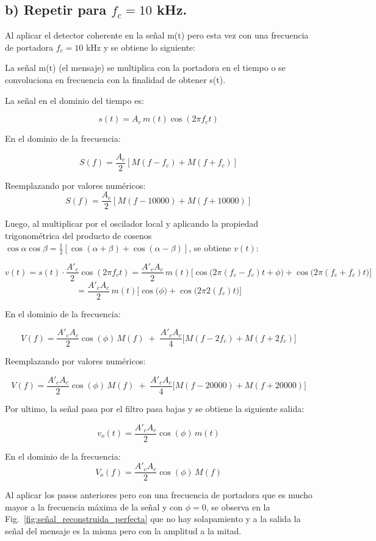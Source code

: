 \subsection*{b) Repetir para $f_c=10$ kHz.}  

Al aplicar el detector coherente en la señal m(t) pero esta vez con una frecuencia de portadora $f_c=10$ kHz y se obtiene lo siguiente:
\bigskip

La señal m(t) (el mensaje) se multiplica con la portadora en el tiempo o se convoluciona en frecuencia con la finalidad de obtener s(t).
\bigskip

La señal en el dominio del tiempo es:

\[
s(t) = A_c \, m(t) \cos(2\pi f_c t)
\]

En el dominio de la frecuencia:

\[
S(f) = \frac{A_c}{2} \left[ M(f-f_c) + M(f+f_c) \right]
\]

Reemplazando por valores numéricos:
\[
S(f) = \frac{A_c}{2} \left[ M(f-10000) + M(f+10000) \right]
\]

Luego, al multiplicar por el oscilador local y aplicando la propiedad trigonométrica del producto de cosenos $\cos\alpha \cos\beta = \tfrac{1}{2}\left[\cos(\alpha+\beta)+\cos(\alpha-\beta)\right]$, se obtiene $v(t)$:

\[
v(t) = s(t) \cdot \frac{A'_c}{2} \cos(2\pi f_c t) =  \frac{A'_c A_c}{2} \, m(t) \Big[ \cos\big(2\pi(f_c-f_c)t + \phi \big)  + \cos\big(2\pi(f_c+f_c)t\big) \Big]
\]
\[
 = \frac{A'_c A_c}{2} \, m(t) \Big[\cos\big(\phi \big)  + \cos\big(2\pi2(f_c)t\big) \Big] 
\]

En el dominio de la frecuencia:

\[
V(f) = \frac{A'_c A_c}{2}\cos(\phi)\, M(f) \;+\; \frac{A'_c A_c}{4}\Big[ M(f-2f_c) + M(f+2f_c) \Big]
\]

Reemplazando por valores numéricos: 

\[
V(f) = \frac{A'_c A_c}{2}\cos(\phi)\, M(f) \;+\; \frac{A'_c A_c}{4}\Big[ M(f-20000) + M(f+20000) \Big]
\]

Por ultimo, la señal pasa por el filtro pasa bajas y se obtiene la siguiente salida:

\[
v_o(t) = \frac{A'_c A_c}{2}\cos(\phi)\, m(t) 
\]

En el dominio de la frecuencia:
\[
V_o(f) = \frac{A'_c A_c}{2}\cos(\phi)\, M(f) 
\]


Al aplicar los pasos anteriores pero con una frecuencia de portadora que es mucho mayor a la frecuencia máxima de la señal y con $\phi = 0$, se observa en la Fig.~\ref{fig:señal_reconstruida_perfecta} que no hay solapamiento y a la salida la señal del mensaje es la misma pero con la amplitud a la mitad.


